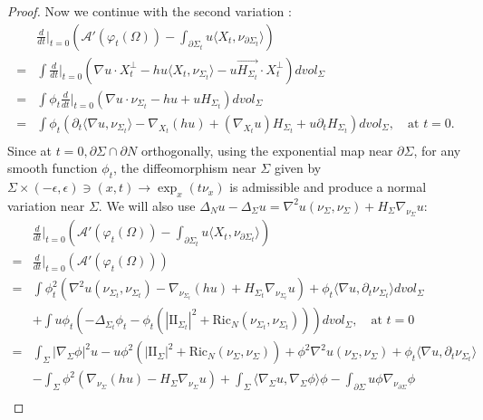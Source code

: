 \documentclass[10pt,a4paper]{amsart}
\newcommand{\Ric}{\text{Ric}}
\newcommand{\p}{\partial}
\newcommand{\sff}{\mathrm{I\!I}}
\begin{document}
\begin{proof}
		Now we continue with the second variation :
		\begin{align*}
			&\frac{d}{dt}\Big\vert_{t=0}(\mathcal{A}'(\varphi_t(\Omega))-\int_{\partial \Sigma_t} u \langle X_t, \nu_{\partial \Sigma_t}\rangle)\\
			=& \int \frac{d}{dt}\Big\vert_{t=0}(\nabla u \cdot X^{\perp}_t -hu\langle X_t, \nu_{\Sigma_t}\rangle-u\vec{H_{\Sigma_t}}\cdot X^{\perp}_t ) dvol_{\Sigma}\\
			=&\int \phi_t \frac{d}{dt} \Big\vert_{t=0}(\nabla u \cdot \nu_{\Sigma_t} -hu+uH_{\Sigma_t})dvol_{\Sigma}\\
			=& \int \phi_t (\partial_t \langle\nabla u,  \nu_{\Sigma_t}\rangle-\nabla_{X_t}(hu)+ (\nabla_{X_t} u) H_{\Sigma_t}+ u \partial_t H_{\Sigma_t}) dvol_{\Sigma},  \quad \text{at $t=0$}.\\
		\end{align*}
			Since at $t=0, \partial \Sigma \cap \partial N$ orthogonally, using the exponential map near $\partial \Sigma$, for any smooth function $\phi_t$, the diffeomorphism near $\Sigma$ given by $\Sigma \times (-\epsilon,\epsilon) \ni (x,t) \rightarrow \exp_x(t\nu_x)$ is admissible and produce a normal variation near $\Sigma$.
			We will also use $\Delta_N u-\Delta_{\Sigma}u=\nabla^2 u(\nu_{\Sigma},\nu_{\Sigma})+H_{\Sigma}\nabla_{\nu_{\Sigma}}u$:
		\begin{align*}
			&\frac{d}{dt}\Big\vert_{t=0}(\mathcal{A}'(\varphi_t(\Omega))-\int_{\partial \Sigma_t} u \langle X_t, \nu_{\partial \Sigma_t}\rangle)\\
			=&\frac{d}{dt}\Big\vert_{t=0}(\mathcal{A}'(\varphi_t(\Omega)))\\
			=& \int \phi_t^2(\nabla^2u(\nu_{\Sigma_t},\nu_{\Sigma_t})-\nabla_{ \nu_{\Sigma_t}}(hu)+H_{\Sigma_t}\nabla_{ \nu_{\Sigma_t}}u) +\phi_t \langle\nabla u,\p_t \nu_{\Sigma_t}\rangle dvol_{\Sigma}\\
			&+ \int u \phi_t(-\Delta_{\Sigma_t} \phi_t-\phi_t(|\sff_{\Sigma_t}|^2+\Ric_N(\nu_{\Sigma_t},\nu_{\Sigma_t})))dvol_{\Sigma}  ,  \quad \text{at $t=0$} \\
			=& \int_{\Sigma} |\nabla_{\Sigma} \phi|^2u  -u\phi^2(|\sff_{\Sigma}|^2+\Ric_N(\nu_{\Sigma},\nu_{\Sigma}))+ \phi^2 \nabla^2 u(\nu_{\Sigma},\nu_{\Sigma})+\phi_t \langle\nabla u,\p_t \nu_{\Sigma_t}\rangle\\
			&-\int_{\Sigma} \phi^2(\nabla_{ \nu_{\Sigma}}(hu)-H_{\Sigma}\nabla_{ \nu_{\Sigma}}u)+\int_{\Sigma} \langle \nabla_{\Sigma} u, \nabla_{\Sigma} \phi \rangle \phi   -\int_{\partial \Sigma} u\phi \nabla_{\nu_{\partial \Sigma}} \phi\\

\end{align*}
\end{proof}
\end{document}

